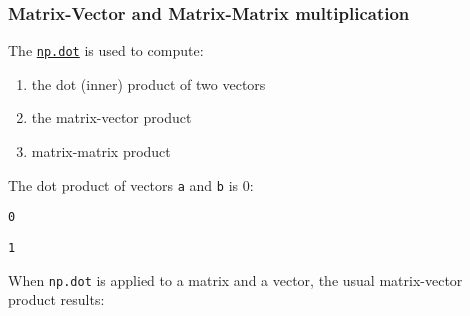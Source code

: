\documentclass[english,serif,mathserif,xcolor=pdftex,dvipsnames,table]{beamer}
\begin{document}
\subsubsection{Matrix-Vector and Matrix-Matrix
multiplication}\label{matrix-vector-and-matrix-matrix-multiplication}

The
\href{https://docs.scipy.org/doc/numpy/reference/generated/numpy.dot.html}{\texttt{np.dot}}
is used to compute:

\begin{enumerate}
\tightlist
\item
  the dot (inner) product of two vectors
\item
  the matrix-vector product
\item
  matrix-matrix product
\end{enumerate}

\begin{Shaded}
\begin{Highlighting}[]
\OperatorTok{=} \NormalTok{np.array([}\NormalTok{, }\NormalTok{])}
\OperatorTok{=} \NormalTok{np.array([}\NormalTok{, }\NormalTok{])}
\end{Highlighting}
\end{Shaded}

The dot product of vectors \texttt{a} and \texttt{b} is 0:

\begin{Shaded}
\begin{Highlighting}[]
\end{Highlighting}
\end{Shaded}

\begin{verbatim}
0
\end{verbatim}

\begin{Shaded}
\begin{Highlighting}[]
\end{Highlighting}
\end{Shaded}

\begin{verbatim}
1
\end{verbatim}

When \texttt{np.dot} is applied to a matrix and a vector, the usual
matrix-vector product results:

\begin{Shaded}
\begin{Highlighting}[]
\end{Highlighting}
\end{Shaded}
\end{document}
